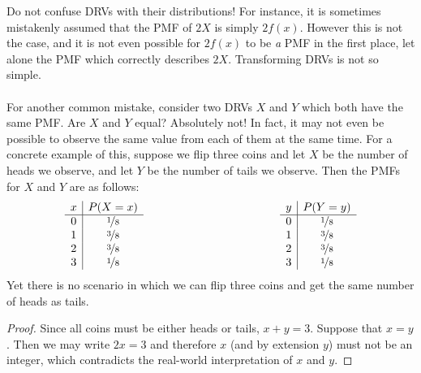 \begin{notsofast}
    Do not confuse DRVs with their distributions! For instance, it is sometimes mistakenly assumed that the PMF of $2X$ is simply $2f(x)$. However this is not the case, and it is not even possible for $2f(x)$ to be \emph a PMF in the first place, let alone the PMF which correctly describes $2X$. Transforming DRVs is not so simple.
    \\\\
    For another common mistake, consider two DRVs $X$ and $Y$ which both have the same PMF. Are $X$ and $Y$ equal? Absolutely not! In fact, it may not even be possible to observe the same value from each of them at the same time. For a concrete example of this, suppose we flip three coins and let $X$ be the number of heads we observe, and let $Y$ be the number of tails we observe. Then the PMFs for $X$ and $Y$ are as follows:
    \[
        \begin{array}{ccc}
            \begin{array}{c|c}
                x & P(X=x) \\
                \hline
                0 & \nicefrac 18 \\
                1 & \nicefrac 38 \\
                2 & \nicefrac 38 \\
                3 & \nicefrac 18
            \end{array}
            & \hspace{100px} &
            \begin{array}{c|c}
                y & P(Y=y) \\
                \hline
                0 & \nicefrac 18 \\
                1 & \nicefrac 38 \\
                2 & \nicefrac 38 \\
                3 & \nicefrac 18
            \end{array}
        \end{array}
    \]
    Yet there is no scenario in which we can flip three coins and get the same number of heads as tails.
    \begin{proof}
        Since all coins must be either heads or tails, $x+y=3$. Suppose that $x=y$. Then we may write $2x=3$ and therefore $x$ (and by extension $y$) must not be an integer, which contradicts the real-world interpretation of $x$ and $y$.
    \end{proof}
\end{notsofast}

